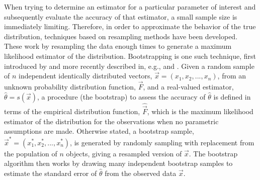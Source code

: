 \documentclass[structabstract]{aa}
\begin{document}
When trying to determine an estimator for a particular parameter of interest and subsequently evaluate the accuracy of that estimator, a small sample size is immediately limiting. Therefore, in order to approximate the behavior of the true distribution, techniques based on resampling methods have been developed. These work by resampling the data enough times to generate a maximum likelihood estimator of the distribution. Bootstrapping is one such technique, first introduced by \citet{Efron:1979p1831} and more recently described in, e.g., \citet{1994.book.Efron} and \citet{Chernick1999}. Given a random sample of $n$ independent identically distributed vectors, $\vec{x} = \left( x_1, x_2, ..., x_n \right)$, from an unknown probability distribution function, $\vec{F}$, and a real-valued estimator, $\hat{\theta} = s \left( \vec{x} \right)$, a procedure (the bootstrap) to assess the accuracy of $\hat{\theta}$ is defined in terms of the empirical distribution function, $\hat{\vec{F}}$, which is the maximum likelihood estimator of the distribution for the observations when no parametric assumptions are made. Otherwise stated, a bootstrap sample, $\vec{x}^* = \left( x_1^*, x_2^*, ..., x_n^* \right)$, is generated by randomly sampling with replacement from the population of $n$ objects, giving a resampled version of $\vec{x}$. The bootstrap algorithm then works by drawing many independent bootstrap samples to estimate the standard error of $\hat{\theta}$ from the observed data $\vec{x}$.
\end{document}
